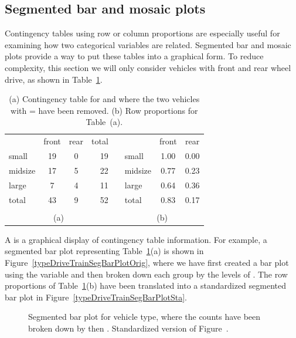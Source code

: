 \subsection{Segmented bar and mosaic plots}
\label{segmentedBarPlotsAndIndependence}

Contingency tables using row or column proportions are especially useful for examining how two categorical variables are related. Segmented bar and mosaic plots provide a way to put these tables into a graphical form. To reduce complexity, this section we will only consider vehicles with front and rear wheel drive, as shown in Table~\ref{typeDriveTrainTableTotalsMinus4wdMain}.
\begin{table}
\centering
\begin{tabular}{l cc r  c l cc}
   \cline{1-4}\cline{6-8}
 & front & rear & total & \hspace{1cm} & & front & rear \\ 
   \cline{1-4}\cline{6-8}
small &  19 &   0 & 19  & & small &  1.00 &   0.00\\ 
midsize &  17 &  5 & 22 & & midsize &  0.77 & 0.23 \\ 
large &   7 &   4 & 11  & & large &   0.64 &  0.36\\ 
   \cline{1-4} \cline{6-8}
total & 43 & 9 & 52  & & total & 0.83 & 0.17\\
   \cline{1-4} \cline{6-8}
 &&&&&&&\vspace{-2mm}  \\
   \multicolumn{4}{c}{(a)} && \multicolumn{3}{c}{(b)}
\end{tabular}
\caption{(a) Contingency table for  and  where the two vehicles with  =  have been removed. (b) Row proportions for Table~(a).}
\label{typeDriveTrainTableTotalsMinus4wdMain}
\end{table}

A  is a graphical display of contingency table information. For example, a segmented bar plot representing Table~\ref{typeDriveTrainTableTotalsMinus4wdMain}(a) is shown in Figure~\ref{typeDriveTrainSegBarPlotOrig}, where we have first created a bar plot using the  variable and then broken down each group by the levels of . The row proportions of Table~\ref{typeDriveTrainTableTotalsMinus4wdMain}(b) have been translated into a standardized segmented bar plot in Figure~\ref{typeDriveTrainSegBarPlotSta}.

\begin{figure}%
\centering
{}
\caption{ Segmented bar plot for vehicle type, where the counts have been broken down by  then .  Standardized version of Figure~.}
\label{typeDriveTrainSegBarPlot}
\end{figure}

